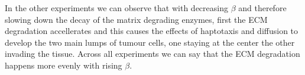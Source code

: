 In the other experiments we can observe that with decreasing $\beta$ and therefore slowing down the decay of the matrix degrading enzymes, first the ECM degradation accellerates and this causes the effects of haptotaxis and diffusion to develop the two main lumps of tumour cells, one staying at the center the other invading the tissue.
Across all experiments we can say that the ECM degradation happens more evenly with rising $\beta$.

